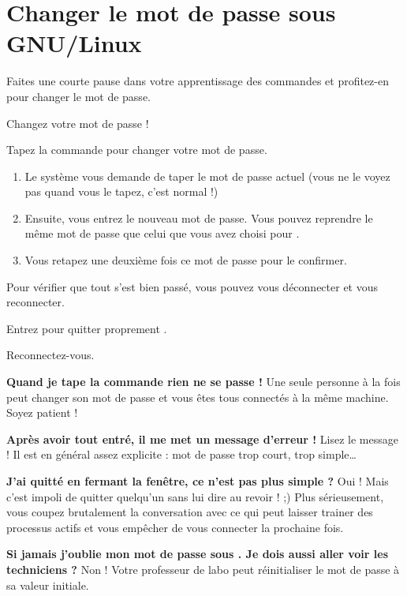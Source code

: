 \documentclass[a4paper,11pt]{style-esi/td}
\begin{document}
	\section{Changer le mot de passe sous GNU/Linux}

		Faites une courte pause dans votre apprentissage des commandes
		et profitez-en pour changer le mot de passe.

		\begin{Tutoriel}{Changez votre mot de passe !}
			\vspace{-1em}
			\begin{steps}
			\item Tapez la commande  pour changer votre mot de passe.
				\begin{enumerate}				
					\item 
						Le système vous demande de taper le mot de passe actuel 
						(vous ne le voyez pas quand vous le tapez, c'est normal !)
					\item 
						Ensuite, vous entrez le nouveau mot de passe.
						Vous pouvez reprendre le même mot de passe 
						que celui que vous avez choisi pour .
					\item 
						Vous retapez une deuxième fois ce mot de passe pour le confirmer.
				\end{enumerate}
			\end{steps}
			Pour vérifier que tout s'est bien passé, 
			vous pouvez vous déconnecter et vous reconnecter.
			\begin{steps}
			\item Entrez  pour quitter proprement \samp{linux1}.
			\item Reconnectez-vous. 
			\end{steps}
		\end{Tutoriel}
			
		\begin{faq}
			\textbf{Quand je tape la commande rien ne se passe !}
				Une seule personne à la fois peut changer son mot de passe 
				et vous êtes tous connectés à la même machine. 
				Soyez patient !

			\medskip	
			\textbf{Après avoir tout entré, il me met un message d'erreur !}
				Lisez le message ! Il est en général assez explicite : 
				mot de passe trop court, trop simple\dots

			\medskip
			\textbf{J'ai quitté en fermant la fenêtre, ce n'est pas plus simple ?}
				Oui ! Mais c'est impoli de quitter quelqu'un sans lui dire au revoir ! ;) 
				Plus sérieusement, vous coupez brutalement la conversation 
				avec  
				ce qui peut laisser trainer des processus actifs et vous 
				empêcher de vous connecter la prochaine fois.

			\medskip
			\textbf{Si jamais j'oublie mon mot de passe sous . Je dois aussi aller voir les techniciens ?}			
				Non ! Votre professeur de labo peut réinitialiser le mot de passe  à sa valeur initiale.
		\end{faq}
\end{document}
